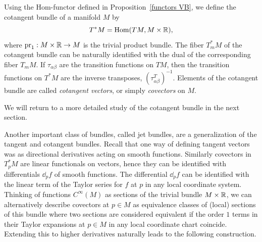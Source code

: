 \begin{defn}
    Using the Hom-functor defined in Proposition~\ref{functors VB}, we define the cotangent bundle of a manifold $M$ by 
    \[T^\ast M=\operatorname{Hom}(TM,M\times\mathbb{R}),\]
    where $\operatorname{pr}_1:M\times\mathbb{R}\to M$ is the trivial product bundle. The fiber $T^\ast_m M$ of the cotangent bundle can be naturally identified with the dual of the corresponding fiber $T_mM$. If $\tau_{\alpha\beta}$ are the transition functions on $TM$, then the transition functions on $T^\ast M$ are the inverse transposes, $(\tau_{\alpha\beta}^T)^{-1}$. Elements of the cotangent bundle are called \emph{cotangent vectors}, or simply \emph{covectors} on $M$.
\end{defn}
We will return to a more detailed study of the cotangent bundle in the next section.

Another important class of bundles, called jet bundles, are a generalization of the tangent and cotangent bundles. Recall that one way of defining tangent vectors was as directional derivatives acting on smooth functions. Similarly covectors in $T_p^\ast M$ are linear functionals on vectors, hence they can be identified with differentials $\dd_p f$ of smooth functions. The differential $\dd_p f$ can be identified with the linear term of the Taylor series for $f$ at $p$ in any local coordinate system. Thinking of functions $C^\infty(M)$ as sections of the trivial bundle $M\times\mathbb{R}$, we can alternatively describe covectors at $p\in M$ as equivalence classes of (local) sections of this bundle where two sections are considered equivalent if the order $1$ terms in their Taylor expansions at $p\in M$ in any local coordinate chart coincide. Extending this to higher derivatives naturally leads to the following construction.

